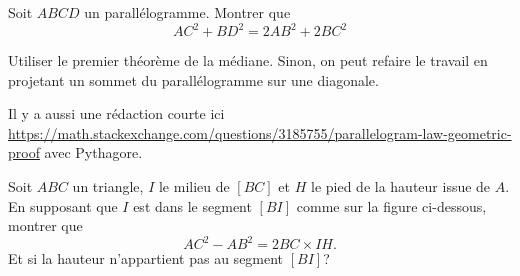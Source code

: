 \begin{exo}
Soit $ABCD$ un parallélogramme.
Montrer que
\[ AC^2+BD^2 = 2AB^2+2BC^2\]
\begin{center}
\begin{tikzpicture}
\end{tikzpicture}
\end{center}
\begin{hint}
Utiliser le premier théorème de la médiane. Sinon, on peut refaire le travail en projetant un sommet du parallélogramme sur une diagonale.
\end{hint}
\begin{sol}
Il y a aussi une rédaction courte ici \url{https://math.stackexchange.com/questions/3185755/parallelogram-law-geometric-proof} avec Pythagore.
\end{sol}
\end{exo}


\begin{exo}
Soit $ABC$ un triangle,  $I$ le milieu de $[BC]$ et $H$ le pied de la hauteur issue de $A$.
En supposant que $I$ est dans le segment $[BI]$ comme sur la figure ci-dessous, montrer que 
\[ AC^2-AB^2 = 2BC\times IH.\]
Et si la hauteur n'appartient pas au segment $[BI]$? 
\begin{center}
\end{center}
\begin{hint}

\end{hint}
\end{exo}



\begin{exo}
\begin{center}
\begin{tikzpicture}
\end{tikzpicture}
\end{center}
\begin{hint}
\end{hint}
\begin{sol}
\end{sol}
\end{exo}

